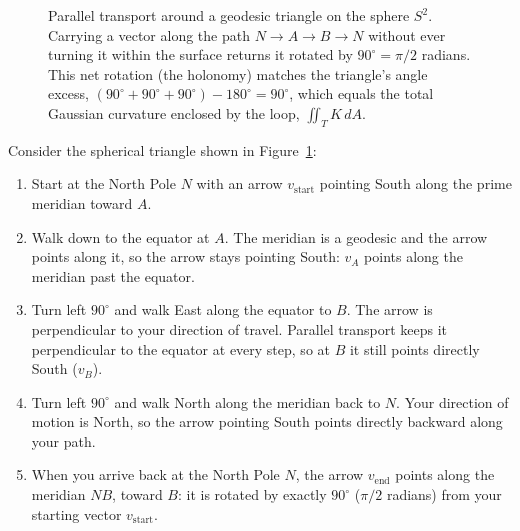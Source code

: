 \begin{figure}[htbp]
\caption{Parallel transport around a geodesic triangle on the sphere $S^2$. Carrying a vector along the path $N \to A \to B \to N$ without ever turning it within the surface returns it rotated by $90^\circ = \pi/2$ radians. This net rotation (the holonomy) matches the triangle's angle excess, $(90^\circ + 90^\circ + 90^\circ) - 180^\circ = 90^\circ$, which equals the total Gaussian curvature enclosed by the loop, $\iint_T K \, dA$.}\label{23:fig-parallel-transport-sphere}
\end{figure}

Consider the spherical triangle shown in Figure~\ref{23:fig-parallel-transport-sphere}:
\begin{enumerate}
\item Start at the North Pole $N$ with an arrow $v_{\text{start}}$ pointing South along the prime meridian toward $A$.
\item Walk down to the equator at $A$. The meridian is a geodesic and the arrow points along it, so the arrow stays pointing South: $v_A$ points along the meridian past the equator.
\item Turn left $90^\circ$ and walk East along the equator to $B$. The arrow is perpendicular to your direction of travel. Parallel transport keeps it perpendicular to the equator at every step, so at $B$ it still points directly South ($v_B$).
\item Turn left $90^\circ$ and walk North along the meridian back to $N$. Your direction of motion is North, so the arrow pointing South points directly backward along your path.
\item When you arrive back at the North Pole $N$, the arrow $v_{\text{end}}$ points along the meridian $NB$, toward $B$: it is rotated by exactly $90^\circ$ ($\pi/2$ radians) from your starting vector $v_{\text{start}}$.
\end{enumerate}

